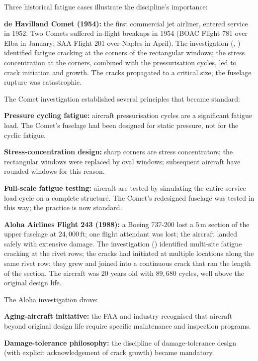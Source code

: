 Three historical fatigue cases illustrate the discipline's importance:

\textbf{de Havilland Comet (1954):} the first commercial jet airliner, entered service in 1952. Two Comets suffered in-flight breakups in 1954 (BOAC Flight 781 over Elba in January; SAA Flight 201 over Naples in April). The investigation (\cite{acc:cohen-comet-report-1955}, \cite{text:withey-fatigue-comet}) identified fatigue cracking at the corners of the rectangular windows; the stress concentration at the corners, combined with the pressurisation cycles, led to crack initiation and growth. The cracks propagated to a critical size; the fuselage rupture was catastrophic.

The Comet investigation established several principles that became standard:

\textbf{Pressure cycling fatigue:} aircraft pressurisation cycles are a significant fatigue load. The Comet's fuselage had been designed for static pressure, not for the cyclic fatigue.

\textbf{Stress-concentration design:} sharp corners are stress concentrators; the rectangular windows were replaced by oval windows; subsequent aircraft have rounded windows for this reason.

\textbf{Full-scale fatigue testing:} aircraft are tested by simulating the entire service load cycle on a complete structure. The Comet's redesigned fuselage was tested in this way; the practice is now standard.

\textbf{Aloha Airlines Flight 243 (1988):} a Boeing 737-200 lost a $5\,\text{m}$ section of the upper fuselage at $24{,}000\,\text{ft}$; one flight attendant was lost; the aircraft landed safely with extensive damage. The investigation (\cite{acc:ntsb-aar94-04}) identified multi-site fatigue cracking at the rivet rows; the cracks had initiated at multiple locations along the same rivet row; they grew and joined into a continuous crack that ran the length of the section. The aircraft was $20$ years old with $89{,}680$ cycles, well above the original design life.

The Aloha investigation drove:

\textbf{Aging-aircraft initiative:} the FAA and industry recognised that aircraft beyond original design life require specific maintenance and inspection programs.

\textbf{Damage-tolerance philosophy:} the discipline of damage-tolerance design (with explicit acknowledgement of crack growth) became mandatory.

